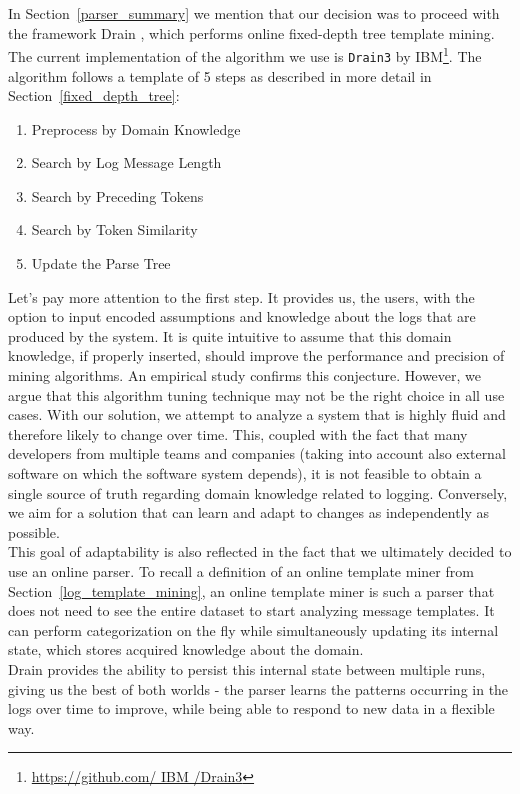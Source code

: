  \begin{figure}[!h] 
\end{figure}

In Section~\ref{parser_summary} we mention that our decision was to proceed with the framework Drain \cite{drain2017}, which performs online fixed-depth tree template mining. The current implementation of the algorithm we use is \texttt{Drain3} by IBM\footnote{\url{https://github.com/ IBM /Drain3}}. The algorithm follows a template of 5 steps as described in more detail in Section~\ref{fixed_depth_tree}:
\begin{enumerate}
    \item Preprocess by Domain Knowledge
    \item Search by Log Message Length
    \item Search by Preceding Tokens
    \item Search by Token Similarity
    \item Update the Parse Tree
\end{enumerate}

Let's pay more attention to the first step. It provides us, the users, with the option to input encoded assumptions and knowledge about the logs that are produced by the system.
It is quite intuitive to assume that this domain knowledge, if properly inserted, should improve the performance and precision of mining algorithms. An empirical study \cite{he2016} confirms this conjecture.
However, we argue that this algorithm tuning technique may not be the right choice in all use cases. With our solution, we attempt to analyze a system that is highly fluid and therefore likely to change over time. This, coupled with the fact that many developers from multiple teams and companies (taking into account also external software on which the software system depends), it is not feasible to obtain a single source of truth regarding domain knowledge related to logging. Conversely, we aim for a solution that can learn and adapt to changes as independently as possible.\\

This goal of adaptability is also reflected in the fact that we ultimately decided to use an online parser.
To recall a definition of an online template miner from Section~\ref{log_template_mining}, an online template miner is such a parser that does not need to see the entire dataset to start analyzing message templates. It can perform categorization on the fly while simultaneously updating its internal state, which stores acquired knowledge about the domain.\\
Drain provides the ability to persist this internal state between multiple runs, giving us the best of both worlds - the parser learns the patterns occurring in the logs over time to improve, while being able to respond to new data in a flexible way.

